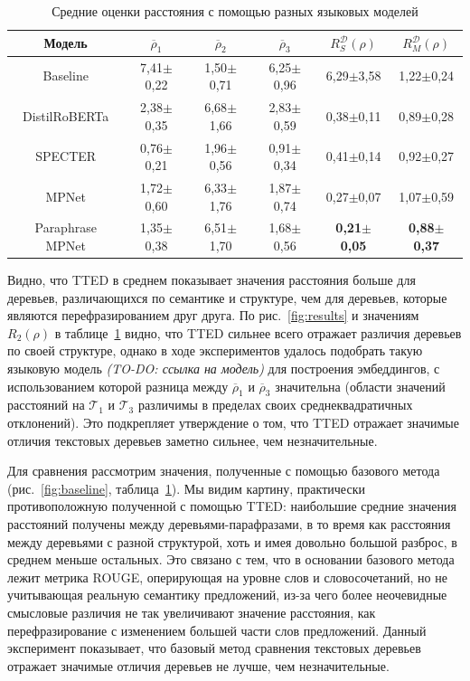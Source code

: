 \documentclass[12pt]{article}
\begin{document}
\begin{table}[h]
    \centering
    \begin{tabular}{c|c|c|c|c|c}
        Модель & $\overline{\rho}_1$ & $\overline{\rho}_2$ & $\overline{\rho}_3$ & $R_S^\mathcal{D}(\rho)$ & $R_M^\mathcal{D}(\rho)$ \\ \hline
        Baseline & 7,41$\pm$0,22 & 1,50$\pm$0,71 & 6,25$\pm$0,96 & 6,29$\pm$3,58 & 1,22$\pm$0,24 \\ \hline
        DistilRoBERTa & 2,38$\pm$0,35 & 6,68$\pm$1,66 & 2,83$\pm$0,59 & 0,38$\pm$0,11 & 0,89$\pm$0,28 \\ \hline
        SPECTER & 0,76$\pm$0,21 & 1,96$\pm$0,56 & 0,91$\pm$0,34 & 0,41$\pm$0,14 & 0,92$\pm$0,27 \\ \hline
        MPNet & 1,72$\pm$0,60 & 6,33$\pm$1,76 & 1,87$\pm$0,74 & 0,27$\pm$0,07 & 1,07$\pm$0,59 \\ \hline
        Paraphrase MPNet & 1,35$\pm$0,38 & 6,51$\pm$1,70 & 1,68$\pm$0,56 & \textbf{0,21$\pm$0,05} & \textbf{0,88$\pm$0,37}
    \end{tabular}
    \caption{Средние оценки расстояния с помощью разных языковых моделей}
    \label{tab:model_results}
\end{table}

Видно, что TTED в среднем показывает значения расстояния больше для деревьев, различающихся по семантике и структуре, чем для деревьев, которые являются перефразированием друг друга. По рис.~\ref{fig:results} и значениям $R_2(\rho)$ в таблице~\ref{tab:model_results} видно, что TTED сильнее всего отражает различия деревьев по своей структуре, однако в ходе экспериментов удалось подобрать такую языковую модель \textit{(TO-DO: ссылка на модель)} для построения эмбеддингов, с использованием которой разница между $\overline{\rho}_1$ и $\overline{\rho}_3$ значительна (области значений расстояний на $\mathcal{T}_1$ и $\mathcal{T}_3$ различимы в пределах своих среднеквадратичных отклонений). Это подкрепляет утверждение о том, что TTED отражает значимые отличия текстовых деревьев заметно сильнее, чем незначительные.

Для сравнения рассмотрим значения, полученные с помощью базового метода (рис.~\ref{fig:baseline}, таблица~\ref{tab:model_results}). Мы видим картину, практически противоположную полученной с помощью TTED: наибольшие средние значения расстояний получены между деревьями-парафразами, в то время как расстояния между деревьями с разной структурой, хоть и имея довольно большой разброс, в среднем меньше остальных. Это связано с тем, что в основании базового метода лежит метрика ROUGE, оперирующая на уровне слов и словосочетаний, но не учитывающая реальную семантику предложений, из-за чего более неочевидные смысловые различия не так увеличивают значение расстояния, как перефразирование с изменением большей части слов предложений. Данный эксперимент показывает, что базовый метод сравнения текстовых деревьев отражает значимые отличия деревьев не лучше, чем незначительные.
\end{document}
